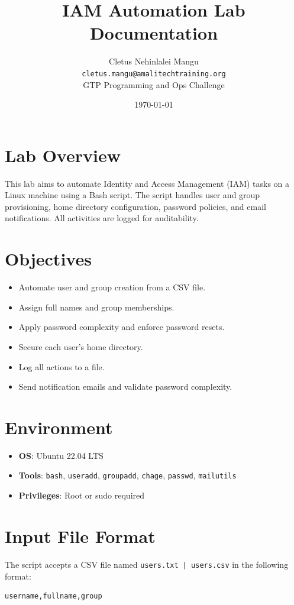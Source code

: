 \documentclass[a4paper,11pt]{article}
\title{\textbf{IAM Automation Lab Documentation}}
\author{Cletus Nehinlalei Mangu \\ \texttt{cletus.mangu@amalitechtraining.org} \\ GTP Programming and Ops Challenge}
\date{\today}
\begin{document}
\maketitle

\section*{Lab Overview}
This lab aims to automate Identity and Access Management (IAM) tasks on a Linux machine using a Bash script. The script handles user and group provisioning, home directory configuration, password policies, and email notifications. All activities are logged for auditability.

\section*{Objectives}
\begin{itemize}
  \item Automate user and group creation from a CSV file.
  \item Assign full names and group memberships.
  \item Apply password complexity and enforce password resets.
  \item Secure each user's home directory.
  \item Log all actions to a file.
  \item Send notification emails and validate password complexity.
\end{itemize}

\section*{Environment}
\begin{itemize}
  \item \textbf{OS}: Ubuntu 22.04 LTS
  \item \textbf{Tools}: \texttt{bash}, \texttt{useradd}, \texttt{groupadd}, \texttt{chage}, \texttt{passwd}, \texttt{mailutils}
  \item \textbf{Privileges}: Root or sudo required
\end{itemize}

\section*{Input File Format}
The script accepts a CSV file named \texttt{users.txt | users.csv} in the following format:
\begin{lstlisting}
username,fullname,group
\end{lstlisting}
\end{document}
